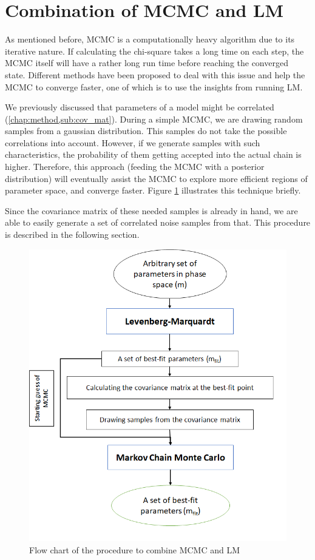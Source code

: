 \documentclass[12pt, TexShade, letterpaper]{report}
\begin{document}
\section{Combination of MCMC and LM}
As mentioned before, MCMC is a computationally heavy algorithm due to its iterative nature. If calculating the chi-square takes a long time on each step, the MCMC itself will have a rather long run time before reaching the converged state. Different methods have been proposed to deal with this issue and help the MCMC to converge faster, one of which is to use the insights from running LM.\par
We previously discussed that parameters of a model might be correlated (\ref{chap:method,sub:cov_mat}). During a simple MCMC, we are drawing random samples from a gaussian distribution. This samples do not take the possible correlations into account. However, if we generate samples with such characteristics, the probability of them getting accepted into the actual chain is higher. Therefore, this approach (feeding the MCMC with a posterior distribution) will eventually assist the MCMC to explore more efficient regions of parameter space, and converge faster. Figure \ref{fig:combined_flow} illustrates this technique briefly.\par
Since the covariance matrix of these needed samples is already in hand, we are able to easily generate a set of correlated noise samples from that. This procedure is described in the following section.\par

\begin{figure}[h!]
\centering
\includegraphics[scale =0.9]{combined_flow.png}
\caption{Flow chart of the procedure to combine MCMC and LM}
\label{fig:combined_flow}
\end{figure}
\end{document}
